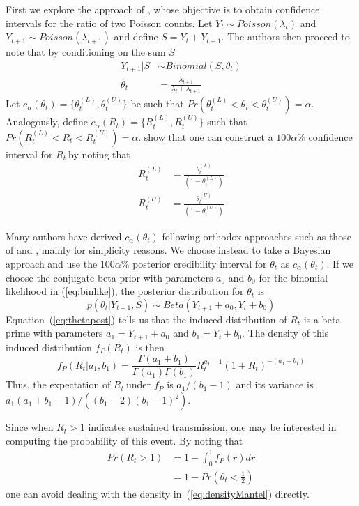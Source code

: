 \documentclass[12pt]{article}
\def \rr {$R_{t}\ $}
\begin{document}
\label{sec:mantel}
First we explore the approach of \citet{mantel}, whose objective is to obtain confidence intervals for the ratio of two Poisson counts. 
Let $Y_{t} \sim Poisson(\lambda_t)$ and $Y_{t+1} \sim Poisson(\lambda_{t+1})$ and define $S = Y_{t} + Y_{t+1}$.
The authors then proceed to note that by conditioning on the sum $S$
\begin{align}
\label{eq:binlike}
Y_{t+1} | S &\sim Binomial(S, \theta_t) \\
\theta_t &= \frac{\lambda_{t+1}}{\lambda_{t} + \lambda_{t+1}}
\end{align}
Let $c_{\alpha}(\theta_t) = \{\theta_t^{(L)} , \theta_t^{(U)} \}$ be such that $Pr(\theta_t^{(L)}<\theta_t <\theta_t^{(U)}) = \alpha$.
Analogously, define $c_{\alpha}(R_t) = \{R_t^{(L)} , R_t^{(U)} \}$ such that $Pr(R_t^{(L)}<R_t<R_t^{(U)}) = \alpha$.
\citet{mantel} show that one can construct a $100\alpha \%$ confidence interval for \rr by noting that
\begin{align}
 R_t^{(L)} &= \frac{\theta_t^{(L)}}{(1-\theta_t^{(L)})}\\
 R_t^{(U)} &= \frac{\theta_t^{(U)}}{(1-\theta_t^{(U)})}
\end{align}

Many authors have derived $c_{\alpha}(\theta_t)$ following orthodox approaches such as those of \citet{wilson} and \citet{clopper}, mainly for simplicity reasons.
We choose instead to take a Bayesian approach and use the  $100\alpha \%$ posterior credibility interval for $\theta_t$ as $c_{\alpha}(\theta_t)$.
If we choose the conjugate beta prior with parameters $a_0$ and $b_0$ for the binomial likelihood in (\ref{eq:binlike}), the posterior distribution for $\theta_t$ is
\begin{equation}
\label{eq:thetapost}
p(\theta_t| Y_{t+1}, S) \sim Beta(Y_{t+1} + a_0, Y_t + b_0)
\end{equation}
Equation~(\ref{eq:thetapost}) tells us that the induced distribution of $R_t$ is a beta prime with parameters $ a_1 = Y_{t+1} + a_0$ and $b_1 =  Y_t + b_0$.
The density of this induced distribution  $f_P(R_t)$ is then 
\begin{equation}
\label{eq:densityMantel}
f_P(R_t| a_1, b_1) = \frac{\Gamma(a_1 + b_1)}{\Gamma(a_1)\Gamma(b_1)} R_t^{a_1 - 1} (1 + R_t)^{-(a_1 + b_1)}
\end{equation}
Thus, the expectation of \rr under $f_P$ is $a_1/(b_1 - 1)$ and its variance is $a_1(a_1 + b_1 - 1)/\left((b_1 - 2)(b_1 - 1)^2 \right) $.

Since when $R_t > 1$ indicates sustained transmission, one may be interested in computing the probability of this event.
By noting that
\begin{align}
\label{cumprobMantel}
Pr(R_t > 1) &= 1 - \int_0^1 f_P(r)dr \\
            &= 1- Pr(\theta_t < \frac{1}{2})
\end{align}
one can avoid dealing with the density in~(\ref{eq:densityMantel}) directly.
\end{document}

